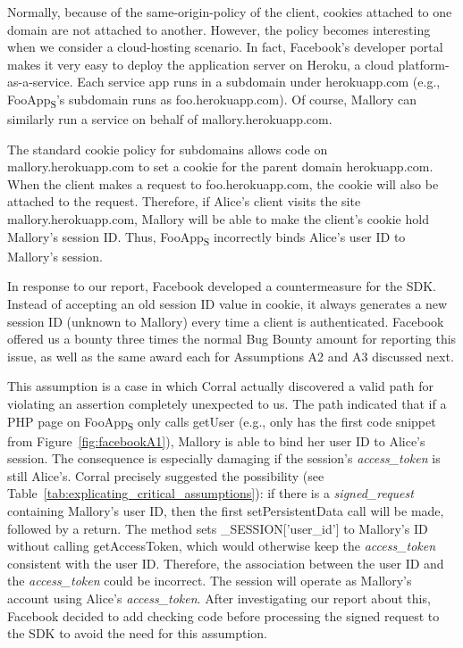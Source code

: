 Normally, because of the same-origin-policy of the client, cookies attached to one domain are not attached to another. However, the policy becomes interesting when we consider a cloud-hosting scenario.  In fact, Facebook's developer portal makes it very easy to deploy the application server on Heroku, a cloud platform-as-a-service.  Each service app runs in a subdomain under herokuapp.com (e.g., FooApp\textsubscript{S}'s subdomain runs as foo.herokuapp.com).  Of course, Mallory can similarly run a service on behalf of mallory.herokuapp.com.

The standard cookie policy for subdomains allows code on mallory.herokuapp.com to set a cookie for the parent domain herokuapp.com.  When the client makes a request to foo.herokuapp.com, the cookie will also be attached to the request. Therefore, if Alice's client visits the site mallory.herokuapp.com, Mallory will be able to make the client's cookie hold Mallory's session ID.  Thus, FooApp\textsubscript{S} incorrectly binds Alice's user ID to Mallory's session. 

In response to our report, Facebook developed a countermeasure for the SDK.  Instead of accepting an old session ID value in cookie, it always generates a new session ID (unknown to Mallory) every time a client is authenticated.  Facebook offered us a bounty three times the normal Bug Bounty amount for reporting this issue, as well as the same award each for Assumptions A2 and A3 discussed next. 

 This assumption is a case in which Corral actually discovered a valid path for violating an assertion completely unexpected to us.  The path indicated that if a PHP page on FooApp\textsubscript{S} only calls getUser (e.g., only has the first code snippet from Figure~\ref{fig:facebookA1}), Mallory is able to bind her user ID to Alice's session.  The consequence is especially damaging if the session's \emph{access\_token} is still Alice's.  Corral precisely suggested the possibility (see Table~\ref{tab:explicating_critical_assumptions}): if there is a \emph{signed\_request} containing Mallory's user ID, then the first setPersistentData call will be made, followed by a return.  The method sets \_SESSION['user\_id'] to Mallory's ID without calling getAccessToken, which would otherwise keep the \emph{access\_token} consistent with the user ID.  Therefore, the association between the user ID and the \emph{access\_token} could be incorrect. The session will operate as Mallory's account using Alice's \emph{access\_token}.  After investigating our report about this, Facebook decided to add checking code before processing the signed request to the SDK to avoid the need for this assumption.

